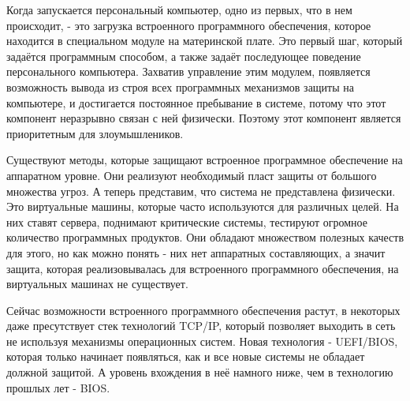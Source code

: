 
Когда запускается персональный компьютер,
	одно из первых,
		что в нем происходит,
	- это загрузка встроенного программного обеспечения,
		которое находится в специальном модуле на материнской плате.
Это первый шаг,
	который задаётся программным способом,
	а также задаёт последующее поведение персонального компьютера.
Захватив управление этим модулем,
	появляется возможность вывода из строя всех программных механизмов защиты на компьютере,
	и достигается постоянное пребывание в системе,
		потому что этот компонент неразрывно связан с ней физически.
Поэтому этот компонент является приоритетным для злоумышлеников.

Существуют методы,
	которые защищают встроенное программное обеспечение на аппаратном уровне.
Они реализуют необходимый пласт защиты от большого множества угроз.
А теперь представим,
	что система не представлена физически.
Это виртуальные машины,
	которые часто используются для различных целей.
На них ставят сервера, поднимают критические системы, тестируют огромное количество программных продуктов.
Они обладают множеством полезных качеств для этого,
	но как можно понять - них нет аппаратных составляющих,
		а значит защита,
			которая реализовывалась для встроенного программного обеспечения,
		на виртуальных машинах не существует.

Сейчас возможности встроенного программного обеспечения растут,
	в некоторых даже пресутствует стек технологий TCP/IP,
		который позволяет выходить в сеть не используя механизмы операционных систем.
Новая технология - UEFI/BIOS,
	которая только начинает появляться,
	как и все новые системы не обладает должной защитой.
А уровень вхождения в неё намного ниже,
	чем в технологию прошлых лет - BIOS.
